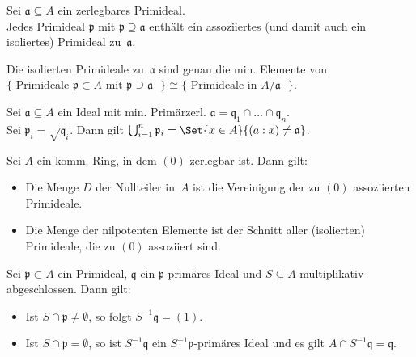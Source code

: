 \documentclass{cheat-sheet}
\newcommand{\aaa}{\mathfrak{a}}
\newcommand{\ppp}{\mathfrak{p}}
\newcommand{\qqq}{\mathfrak{q}}
\begin{document}
\begin{prop}
  Sei $\aaa \subseteq A$ ein zerlegbares Primideal. \\
  Jedes Primideal $\ppp$ mit $\ppp \supseteq \aaa$ enthält ein assoziiertes (und damit auch ein isoliertes) Primideal zu~$\aaa$.
\end{prop}

\begin{kor}
  Die isolierten Primideale zu~$\aaa$ sind genau die min. Elemente von $\{ \text{ Primideale $\ppp \subset A$ mit $\ppp \supseteq \aaa$ } \} \cong \{ \text{ Primideale in $A/\aaa$ } \}$.
\end{kor}



\begin{prop}
  Sei $\aaa \subseteq A$ ein Ideal mit min. Primärzerl. $\aaa = \qqq_1 \cap \ldots \cap \qqq_n$. \\
  Sei $\ppp_i = \sqrt{\qqq_i}$.
  Dann gilt $\bigcup_{i=1}^n \ppp_i = \Set{x \in A}{(a : x) \neq \aaa}$.
\end{prop}

\begin{prop}
  Sei $A$ ein komm. Ring, in dem $(0)$ zerlegbar ist.
  Dann gilt:
  \begin{itemize}
    \item Die Menge $D$ der Nullteiler in~$A$ ist die Vereinigung der zu $(0)$ assoziierten Primideale.
    \item Die Menge der nilpotenten Elemente ist der Schnitt aller (isolierten) Primideale, die zu $(0)$ assoziiert sind.
  \end{itemize}
\end{prop}


\begin{prop}
  Sei $\ppp \subset A$ ein Primideal, $\qqq$ ein $\ppp$-primäres Ideal und $S \subseteq A$ multiplikativ abgeschlossen.
  Dann gilt:
  \begin{itemize}
    \item Ist $S \cap \ppp \neq \emptyset$, so folgt $S^{-1} \qqq = (1)$.
    \item Ist $S \cap \ppp = \emptyset$, so ist $S^{-1} \qqq$ ein $S^{-1} \ppp$-primäres Ideal und es gilt $A \cap S^{-1} \qqq = \qqq$.
  \end{itemize}
\end{prop}
\end{document}
